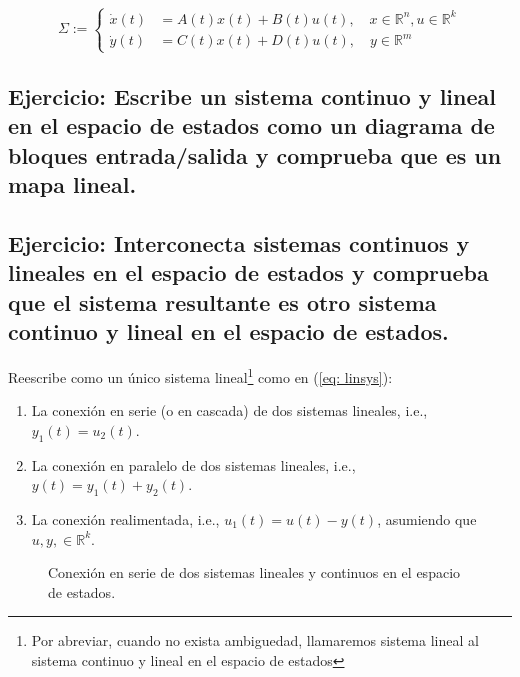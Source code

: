\begin{equation}
	\Sigma := \begin{cases}
	\dot x(t) &= A(t)x(t) + B(t)u(t), \quad x\in\mathbb{R}^n, u\in\mathbb{R}^k \\
	\dot y(t) &= C(t)x(t) + D(t)u(t), \quad y\in\mathbb{R}^m
	\end{cases}
	\label{eq: linsys}
\end{equation}

\subsection{Ejercicio: Escribe un sistema continuo y lineal en el espacio de estados como un diagrama de bloques entrada/salida y comprueba que es un mapa lineal.}

\subsection{Ejercicio: Interconecta sistemas continuos y lineales en el espacio de estados y comprueba que el sistema resultante es otro sistema continuo y lineal en el espacio de estados.}

Reescribe como un único sistema lineal\footnote{Por abreviar, cuando no exista ambiguedad, llamaremos sistema lineal al sistema continuo y lineal en el espacio de estados} como en (\ref{eq: linsys}):

\begin{enumerate}
	\item La conexión en serie (o en cascada) de dos sistemas lineales, i.e., $y_1(t) = u_2(t)$.
	\item La conexión en paralelo de dos sistemas lineales, i.e., $y(t) = y_1(t) + y_2(t)$.
	\item La conexión realimentada, i.e., $u_1(t) = u(t) - y(t)$, asumiendo que $u, y, \in\mathbb{R}^k$.
\end{enumerate}

\begin{figure}
\centering
{}
	\caption{Conexión en serie de dos sistemas lineales y continuos en el espacio de estados.}
	\label{fig: series}
\end{figure}

